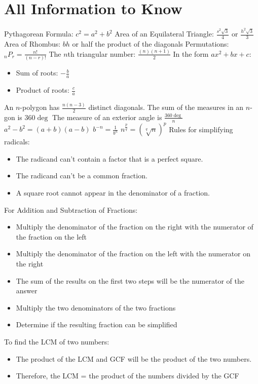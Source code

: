 \documentclass[../uilmath.tex]{subfiles}
\begin{document}
\chapter{All Information to Know}
Pythagorean Formula: $c^2=a^2+b^2$
\smallbreak
Area of an Equilateral Triangle: $\frac{s^2\sqrt{3}}{4}$ or $\frac{h^2\sqrt{3}}{3}$
\smallbreak
Area of Rhombus: $bh$ or half the product of the diagonals
\smallbreak
Permutations: $_nP_r = \frac{n!}{(n-r)!}$
\smallbreak
The $n$th triangular number: $\frac{(n)(n+1)}{2}$
\smallbreak
In the form $ax^2+bx+c$:
\begin{itemize}
    \item Sum of roots: $-\frac{b}{a}$
    \item Product of roots: $\frac{c}{a}$
\end{itemize}
An $n$-polygon has $\frac{n(n-3)}{2}$ distinct diagonals.
\smallbreak
The sum of the measures in an $n$-gon is 360$\deg$
\smallbreak
The measure of an exterior angle is $\frac{360\deg}{n}$
\smallbreak
$a^2-b^2 = (a+b)(a-b)$
\smallbreak
$b^{-n}=\frac{1}{b^n}$
\smallbreak
$n^{\frac{p}{q}}=(\sqrt[q]{n})^p$
\smallbreak
Rules for simplifying radicals:
\begin{itemize}
    \item The radicand can't contain a factor that is a perfect square. 
    \item The radicand can't be a common fraction.
    \item A square root cannot appear in the denominator of a fraction.
\end{itemize}
For Addition and Subtraction of Fractions:
\begin{itemize}
    \item Multiply the denominator of the fraction on the right with the numerator of the fraction on the left
    \item Multiply the denominator of the fraction on the left with the numerator on the right
    \item The sum of the results on the first two steps will be the numerator of the answer
    \item Multiply the two denominators of the two fractions
    \item Determine if the resulting fraction can be simplified
\end{itemize}
To find the LCM of two numbers:
\begin{itemize}
    \item The product of the LCM and GCF will be the product of the two numbers.
    \item Therefore, the LCM = the product of the numbers divided by the GCF
\end{itemize}
\end{document}
